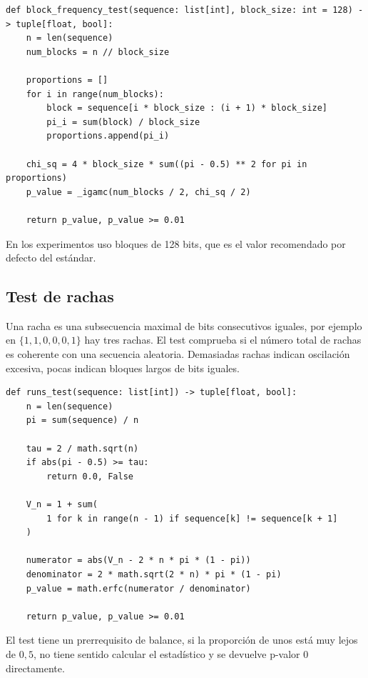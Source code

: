 \begin{lstlisting}[style=Python,caption={Test Block Frequency (\texttt{src/tests\_nist/block\_frequency.py}).}]
def block_frequency_test(sequence: list[int], block_size: int = 128) -> tuple[float, bool]:
    n = len(sequence)
    num_blocks = n // block_size

    proportions = []
    for i in range(num_blocks):
        block = sequence[i * block_size : (i + 1) * block_size]
        pi_i = sum(block) / block_size
        proportions.append(pi_i)

    chi_sq = 4 * block_size * sum((pi - 0.5) ** 2 for pi in proportions)
    p_value = _igamc(num_blocks / 2, chi_sq / 2)

    return p_value, p_value >= 0.01
\end{lstlisting}

En los experimentos uso bloques de 128 bits, que es el valor recomendado por defecto del estándar.

\subsection{Test de rachas}

Una racha es una subsecuencia maximal de bits consecutivos iguales,
por ejemplo en $\{1, 1, 0, 0, 0, 1\}$ hay tres rachas.
El test comprueba si el número total de rachas es coherente con una secuencia aleatoria.
Demasiadas rachas indican oscilación excesiva, pocas indican bloques largos de bits iguales.

\begin{lstlisting}[style=Python,caption={Test de rachas (\texttt{src/tests\_nist/runs.py}).}]
def runs_test(sequence: list[int]) -> tuple[float, bool]:
    n = len(sequence)
    pi = sum(sequence) / n

    tau = 2 / math.sqrt(n)
    if abs(pi - 0.5) >= tau:
        return 0.0, False

    V_n = 1 + sum(
        1 for k in range(n - 1) if sequence[k] != sequence[k + 1]
    )

    numerator = abs(V_n - 2 * n * pi * (1 - pi))
    denominator = 2 * math.sqrt(2 * n) * pi * (1 - pi)
    p_value = math.erfc(numerator / denominator)

    return p_value, p_value >= 0.01
\end{lstlisting}

El test tiene un prerrequisito de balance, si la proporción de unos está muy lejos de $0{,}5$,
no tiene sentido calcular el estadístico y se devuelve p-valor 0 directamente.

